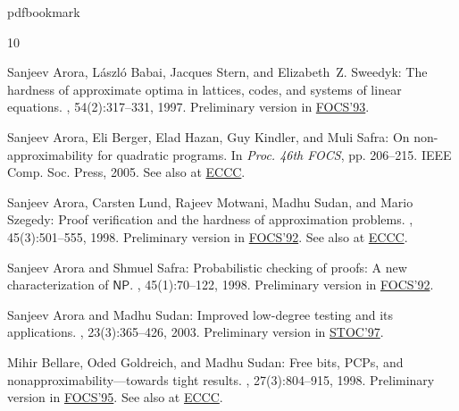 %
%
%
%
%
\providecommand{\bibhead}[1]{}
%
\expandafter\ifx\csname pdfbookmark\endcsname\relax%
  \providecommand{\tocrefpdfbookmark}{}
\else\providecommand{\tocrefpdfbookmark}{%
   \hypertarget{tocreferences}{}%
   \pdfbookmark[1]{References}{tocreferences}}%
\fi

\tocrefpdfbookmark
\begin{thebibliography}{10}

\bibhead{ABSS}
{\sc Sanjeev Arora, L{\'a}szl{\'o} Babai, Jacques Stern, and Elizabeth~Z.
  Sweedyk}: The hardness of approximate optima in lattices, codes, and systems
  of linear equations.
, 54(2):317--331, 1997.
\newblock Preliminary version in
  \href{http://dx.doi.org/10.1109/SFCS.1993.366815}{FOCS'93}.

\bibhead{ABHKS}
{\sc Sanjeev Arora, Eli Berger, Elad Hazan, Guy Kindler, and Muli Safra}: On
  non-approximability for quadratic programs.
\newblock In {\em Proc. 46th FOCS}, pp. 206--215. IEEE Comp. Soc. Press, 2005.
\newblock See also at \href{http://eccc.hpi-web.de/report/2005/058/}{ECCC}.

\bibhead{ALMSS}
{\sc Sanjeev Arora, Carsten Lund, Rajeev Motwani, Madhu Sudan, and Mario
  Szegedy}: Proof verification and the hardness of approximation problems.
, 45(3):501--555, 1998.
\newblock Preliminary version in
  \href{http://dx.doi.org/10.1109/SFCS.1992.267823}{FOCS'92}. See also at
  \href{http://eccc.hpi-web.de/report/1998/008/}{ECCC}.
\newblock [\epfmtdoi{10.1145/278298.278306}]

\bibhead{AS}
{\sc Sanjeev Arora and Shmuel Safra}: Probabilistic checking of proofs: A new
  characterization of $\mathsf{NP}$.
, 45(1):70--122, 1998.
\newblock Preliminary version in
  \href{http://dx.doi.org/10.1109/SFCS.1992.267824}{FOCS'92}.
\newblock [\epfmtdoi{10.1145/273865.273901}]

\bibhead{AroraSudan}
{\sc Sanjeev Arora and Madhu Sudan}: Improved low-degree testing and its
  applications.
, 23(3):365--426, 2003.
\newblock Preliminary version in
  \href{http://dx.doi.org/10.1145/258533.258642}{STOC'97}.
\newblock [\epfmtdoi{10.1007/s00493-003-0025-0}]

\bibhead{BGS}
{\sc Mihir Bellare, Oded Goldreich, and Madhu Sudan}: Free bits, {PCPs}, and
  nonapproximability---towards tight results.
, 27(3):804--915, 1998.
\newblock Preliminary version in
  \href{http://dx.doi.org/10.1109/SFCS.1995.492573}{FOCS'95}. See also at
  \href{http://eccc.hpi-web.de/report/1995/024/}{ECCC}.
\newblock [\epfmtdoi{10.1137/S0097539796302531}]


\end{thebibliography}
